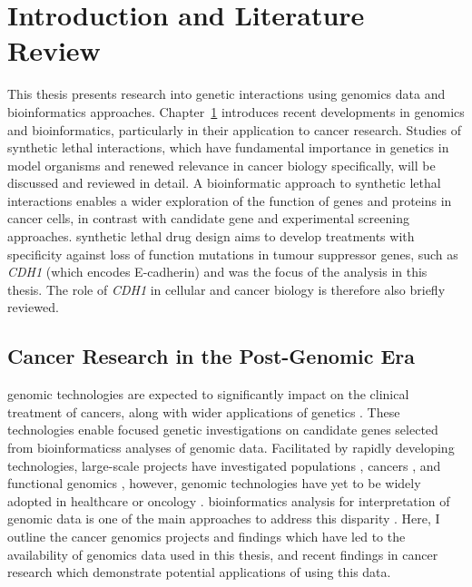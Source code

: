 \chapter{Introduction and Literature Review}
\label{chap:intro}



This thesis presents research into genetic interactions using \glspl{genomic} data and \gls{bioinformatics} approaches. Chapter~\ref{chap:intro} introduces recent developments in \glspl{genomic} and \gls{bioinformatics}, particularly in their application to \gls{cancer} research. Studies of \gls{synthetic lethal} interactions, which have fundamental importance in genetics in model organisms and renewed relevance in \gls{cancer} biology specifically, will be discussed and reviewed in detail.
A bioinformatic approach to \gls{synthetic lethal} interactions enables a wider exploration of the function of genes and proteins in \gls{cancer} cells, in contrast with candidate gene and experimental screening approaches. \Gls{synthetic lethal} drug design aims to develop \glspl{treatment} with specificity against loss of function \glspl{mutation} in \gls{tumour suppressor} genes, such as \textit{CDH1} (which encodes \gls{E-cadherin}) and was the focus of the analysis in this thesis. The role of \textit{CDH1} in cellular and \gls{cancer} biology is therefore also briefly reviewed. 



\section{Cancer Research in the Post-Genomic Era}

\Gls{genomic} technologies are expected to significantly impact on the clinical treatment of \glspl{cancer}, along with wider applications of genetics \citep{Goodwin2016, Roychowdhury2016}. These technologies enable focused genetic investigations on candidate genes selected from \glspl{bioinformatics} analyses of \gls{genomic} data. Facilitated by rapidly developing technologies, large-scale projects have investigated populations \citep{1000Genomes2010}, \glspl{cancer} \citep{Dickson1999, ICGC2011}, and functional \glspl{genomic} \citep{ENCODE2004, FANTOM2001}, however, \gls{genomic} technologies have yet to be widely adopted in healthcare or oncology \citep{Roychowdhury2016, Waldron2016}. \Gls{bioinformatics} analysis for interpretation of \gls{genomic} data is one of the main approaches to address this disparity \citep{Goodwin2016}. Here, I outline the \gls{cancer} \glspl{genomic} projects and findings which have led to the availability of \glspl{genomic} data used in this thesis, and recent findings in \gls{cancer} research which demonstrate potential applications of using this data. 

